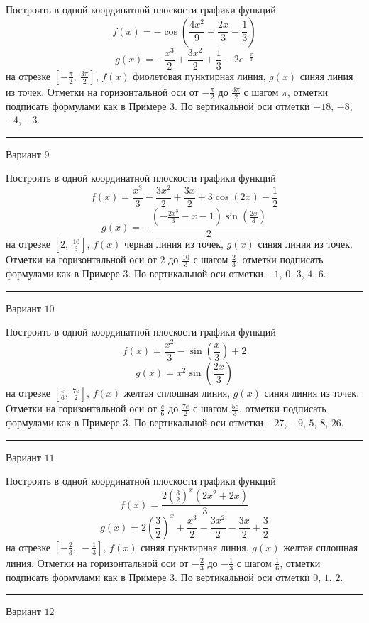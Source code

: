 \documentclass[11pt]{report}
\begin{document}
Построить в одной координатной плоскости графики функций $$f(x) = - \cos{\left(\frac{4 x^{2}}{9} + \frac{2 x}{3} - \frac{1}{3} \right)}$$ $$g(x) = - \frac{x^{3}}{2} + \frac{3 x^{2}}{2} + \frac{1}{3} - 2 e^{- \frac{x}{3}}$$ на отрезке $\left[- \frac{\pi}{2}, \  \frac{3 \pi}{2}\right]$, $f(x)$ фиолетовая пунктирная линия, $g(x)$ синяя линия из точек. Отметки на горизонтальной оси от $- \frac{\pi}{2}$ до $\frac{3 \pi}{2}$ с шагом $\pi$, отметки подписать формулами как в Примере 3. По вертикальной оси отметки $-18$, $-8$, $-4$, $-3$.
\begin{center}
\noindent\rule{8cm}{0.4pt}
\end{center}
Вариант $9$


Построить в одной координатной плоскости графики функций $$f(x) = \frac{x^{3}}{3} - \frac{3 x^{2}}{2} + \frac{3 x}{2} + 3 \cos{\left(2 x \right)} - \frac{1}{2}$$ $$g(x) = - \frac{\left(- \frac{2 x^{3}}{3} - x - 1\right) \sin{\left(\frac{2 x}{3} \right)}}{2}$$ на отрезке $\left[2, \  \frac{10}{3}\right]$, $f(x)$ черная линия из точек, $g(x)$ синяя линия из точек. Отметки на горизонтальной оси от $2$ до $\frac{10}{3}$ с шагом $\frac{2}{3}$, отметки подписать формулами как в Примере 3. По вертикальной оси отметки $-1$, $0$, $3$, $4$, $6$.
\begin{center}
\noindent\rule{8cm}{0.4pt}
\end{center}
Вариант $10$


Построить в одной координатной плоскости графики функций $$f(x) = \frac{x^{2}}{3} - \sin{\left(\frac{x}{3} \right)} + 2$$ $$g(x) = x^{2} \sin{\left(\frac{2 x}{3} \right)}$$ на отрезке $\left[\frac{e}{6}, \  \frac{7 e}{2}\right]$, $f(x)$ желтая сплошная линия, $g(x)$ синяя линия из точек. Отметки на горизонтальной оси от $\frac{e}{6}$ до $\frac{7 e}{2}$ с шагом $\frac{5 e}{3}$, отметки подписать формулами как в Примере 3. По вертикальной оси отметки $-27$, $-9$, $5$, $8$, $26$.
\begin{center}
\noindent\rule{8cm}{0.4pt}
\end{center}
Вариант $11$


Построить в одной координатной плоскости графики функций $$f(x) = \frac{2 \left(\frac{3}{2}\right)^{x} \left(2 x^{2} + 2 x\right)}{3}$$ $$g(x) = 2 \left(\frac{3}{2}\right)^{x} + \frac{x^{3}}{2} - \frac{3 x^{2}}{2} - \frac{3 x}{2} + \frac{3}{2}$$ на отрезке $\left[- \frac{2}{3}, \  - \frac{1}{3}\right]$, $f(x)$ синяя пунктирная линия, $g(x)$ желтая сплошная линия. Отметки на горизонтальной оси от $- \frac{2}{3}$ до $- \frac{1}{3}$ с шагом $\frac{1}{6}$, отметки подписать формулами как в Примере 3. По вертикальной оси отметки $0$, $1$, $2$.
\begin{center}
\noindent\rule{8cm}{0.4pt}
\end{center}
Вариант $12$
\end{document}
